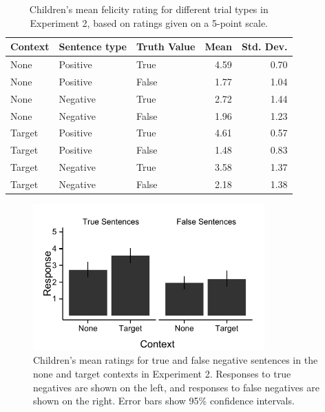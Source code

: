 \documentclass[man, noapacite]{apa2}
\begin{document}
\begin{table}[t]
\caption{\label{tab:m3} Children's mean felicity rating for different trial types in Experiment 2, based on ratings given on a 5-point scale.}
\begin{center}
\small\addtolength{\tabcolsep}{-5pt}
\begin{tabular}{lllrr}
 \hline
 Context & Sentence type & Truth Value & Mean & Std. Dev. \\
 \hline
 None & Positive & True & 4.59 & 0.70\\
 None & Positive & False & 1.77 & 1.04\\
 None & Negative & True & 2.72 & 1.44 \\
 None & Negative & False & 1.96 &1.23 \\
 Target & Positive & True & 4.61 & 0.57\\
 Target & Positive & False & 1.48 & 0.83 \\
 Target & Negative & True & 3.58 & 1.37 \\
 Target & Negative & False & 2.18 & 1.38\\
  \hline
\end{tabular}
\end{center}
\end{table}

\begin{figure}
\begin{center}
\includegraphics[width=3.5in]{figures/childmeans.pdf}
\caption{\label{fig:childmeans} Children's mean ratings for true and false negative sentences in the none and target contexts in Experiment 2. Responses to true negatives are shown on the left, and responses to false negatives are shown on the right. Error bars show 95\% confidence intervals.}
\end{center}
\end{figure}
\end{document}
